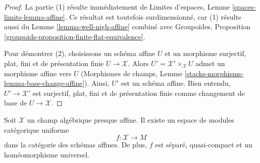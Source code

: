 \begin{proof}
La partie (1) résulte immédiatement de
Limites d'espaces, Lemme \ref{spaces-limits-lemma-affine}.
Ce résultat est toutefois surdimensionné, car (1) résulte aussi du
Lemme \ref{lemma-well-nigh-affine} combiné avec
Groupoïdes, Proposition
\ref{groupoids-proposition-finite-flat-equivalence}.

\medskip\noindent
Pour démontrer (2), choisissons un schéma affine $U$ et un
morphisme surjectif, plat, fini et de présentation finie $U \to \mathcal{X}$.
Alors $U' = \mathcal{X}' \times_\mathcal{X} U$ admet un morphisme
affine vers $U$ (Morphismes de champs, Lemme
\ref{stacks-morphisms-lemma-base-change-affine}).
Ainsi, $U'$ est un schéma affine. Bien entendu,
$U' \to \mathcal{X}'$ est surjectif, plat, fini et de présentation finie
comme changement de base de $U \to \mathcal{X}$.
\end{proof}

\begin{lemma}
\label{lemma-well-nigh-affine-moduli-space}
Soit $\mathcal{X}$ un champ algébrique presque affine. Il existe
un espace de modules catégorique uniforme
$$
f : \mathcal{X} \longrightarrow M
$$
dans la catégorie des schémas affines. De plus,
$f$ est séparé, quasi-compact et un homéomorphisme universel.
\end{lemma}

